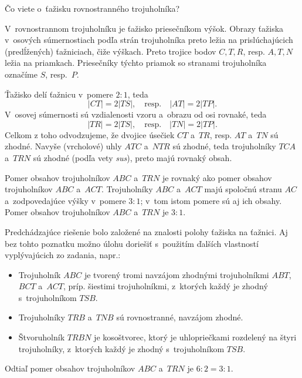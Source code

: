 {%
\napad
Čo viete o~ťažisku rovnostranného trojuholníka?

\riesenie
V~rovnostrannom trojuholníku je ťažisko priesečníkom výšok.
Obrazy ťažiska v~osových súmernostiach podľa strán trojuholníka preto ležia na prislúchajúcich (predĺžených) ťažniciach, čiže výškach.
Preto trojice bodov $C,T,R$, resp. $A,T,N$ ležia na priamkach.
Priesečníky týchto priamok so stranami trojuholníka označíme $S$, resp.~$P$.
%


Ťažisko delí ťažnicu v~pomere $2:1$, teda
$$
|CT|=2|TS|,\quad \text{resp.}\quad |AT|=2|TP|.
$$
V~osovej súmernosti sú vzdialenosti vzoru a~obrazu od osi rovnaké, teda
$$|TR|=2|TS|,\quad \text{resp.}\quad |TN|=2|TP|.
$$
Celkom z toho odvodzujeme, že dvojice úsečiek $CT$ a~$TR$, resp. $AT$ a~$TN$ sú zhodné.
Navyše (vrcholové) uhly $ATC$ a~$NTR$ sú zhodné, teda trojuholníky $TCA$ a~$TRN$ sú zhodné (podľa vety {\it sus\/}), preto majú rovnaký obsah.

Pomer obsahov trojuholníkov $ABC$ a~$TRN$ je rovnaký ako pomer obsahov trojuholníkov $ABC$ a~$ACT$.
Trojuholníky $ABC$ a~$ACT$ majú spoločnú stranu $AC$ a~zodpovedajúce výšky v~pomere $3:1$;
v~tom istom pomere sú aj ich obsahy.
Pomer obsahov trojuholníkov $ABC$ a~$TRN$ je $3:1$.

\poznamka
Predchádzajúce riešenie bolo založené na znalosti polohy ťažiska na ťažnici.
Aj bez tohto poznatku možno úlohu doriešiť s~použitím ďalších vlastností vyplývajúcich zo zadania, napr.:
\begin{itemize}
\item Trojuholník $ABC$ je tvorený tromi navzájom zhodnými trojuholníkmi $ABT$, $BCT$ a~$ACT$, príp. šiestimi trojuholníkmi, z~ktorých každý je zhodný s~trojuholníkom $TSB$.
\item Trojuholníky $TRB$ a~$TNB$ sú rovnostranné, navzájom zhodné.
\item Štvoruholník $TRBN$ je kosoštvorec, ktorý je uhlopriečkami rozdelený na štyri trojuholníky, z~ktorých každý je zhodný s~trojuholníkom $TSB$.
\end{itemize}
Odtiaľ pomer obsahov trojuholníkov $ABC$ a~$TRN$ je $6:2=3:1$.
}


